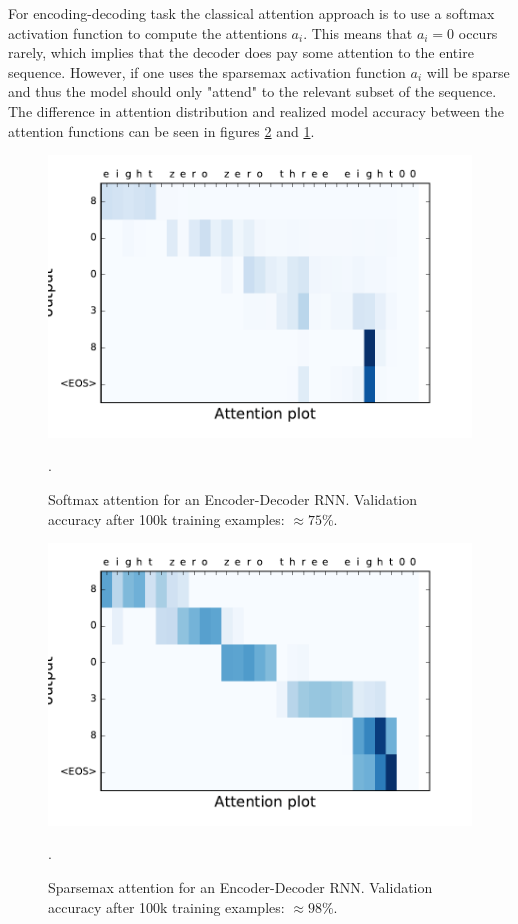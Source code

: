 For encoding-decoding task the classical attention approach is to use a softmax activation function to compute the attentions $a_i$. This means that $a_i=0$ occurs rarely, which implies that the decoder does pay some attention to the entire sequence. However, if one uses the sparsemax activation function $a_i$ will be sparse and thus the model should only "attend" to the relevant subset of the sequence. The difference in attention distribution and realized model accuracy between the attention functions can be seen in figures \ref{fig:sparsemax} and \ref{fig:softmax}. 
\begin{figure}[H]
	\centering
	\includegraphics[scale=0.5]{figures/attention_softmax.pdf}
	\caption{Softmax attention for an Encoder-Decoder RNN. Validation accuracy after 100k training examples: $\approx 75$\%.}
	\label{fig:softmax}.
\end{figure}
\begin{figure}[H]
 	\centering
 	\includegraphics[scale=0.5]{figures/attention_sparsemax.pdf}
 	\caption{Sparsemax attention for an Encoder-Decoder RNN. Validation accuracy after 100k training examples: $\approx 98$\%.}
 	\label{fig:sparsemax}.
\end{figure}
  
